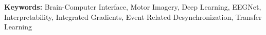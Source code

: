 
\vspace{1cm}
\noindent\textbf{Keywords:} Brain-Computer Interface, Motor Imagery, 
Deep Learning, EEGNet, Interpretability, Integrated Gradients, 
Event-Related Desynchronization, Transfer Learning
